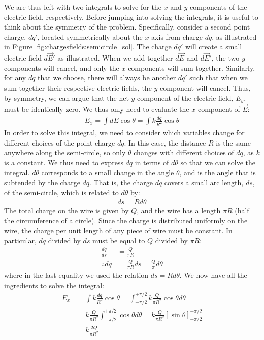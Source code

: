 We are thus left with two integrals to solve for the $x$ and $y$ components of the electric field, respectively. Before jumping into solving the integrals, it is useful to think about the symmetry of the problem. Specifically, consider a second point charge, $dq'$, located symmetrically about the $x$-axis from charge $dq$, as illustrated in Figure \ref{fig:chargesfields:semicircle_sol}. The charge $dq'$ will create a small electric field $d\vec E'$ as illustrated. When we add together $d\vec E$ and $d\vec E'$, the two $y$ components will cancel, and only the $x$ components will sum together. Similarly, for any $dq$ that we choose, there will always be another $dq'$ such that when we sum together their respective electric fields, the $y$ component will cancel. Thus, by symmetry, we can argue that the net $y$ component of the electric field, $E_y$, must be identically zero. We thus only need to evaluate the $x$ component of $\vec E$:
\begin{align*}
E_x = \int dE\cos\theta = \int k\frac{dq}{R^2} \cos\theta
\end{align*}
In order to solve this integral, we need to consider which variables change for different choices of the point charge $dq$. In this case, the distance $R$ is the same anywhere along the semi-circle, so only $\theta$ changes with different choices of $dq$, as $k$ is a constant. We thus need to express $dq$ in terms of $d\theta$ so that we can solve the integral. $d\theta$ corresponds to a small change in the angle $\theta$, and is the angle that is subtended by the charge $dq$. That is, the charge $dq$ covers a small arc length, $ds$, of the semi-circle, which is related to $d\theta$ by:
\begin{align*}
ds = Rd\theta
\end{align*}
The total charge on the wire is given by $Q$, and the wire has a length $\pi R$ (half the circumference of a circle). Since the charge is distributed uniformly on the wire, the charge per unit length of any piece of wire must be constant. In particular, $dq$ divided by $ds$ must be equal to $Q$ divided by $\pi R$:
\begin{align*}
\frac{dq}{ds}&=\frac{Q}{\pi R}\\
\therefore dq &=\frac{Q}{\pi R}ds=\frac{Q}{\pi}d\theta
\end{align*}
where in the last equality we used the relation $ds=Rd\theta$. We now have all the ingredients to solve the integral:
\begin{align*}
E_x &= \int k\frac{dq}{R^2} \cos\theta = \int_{-\pi/2}^{+\pi/2} k\frac{Q}{\pi R^2}\cos\theta d\theta\\
&= k\frac{Q}{\pi R^2}\int_{-\pi/2}^{+\pi/2}\cos\theta d\theta=k\frac{Q}{\pi R^2}\left[ \sin\theta \right]_{-\pi/2}^{+\pi/2}\\
&= k\frac{2Q}{\pi R^2}
\end{align*}
